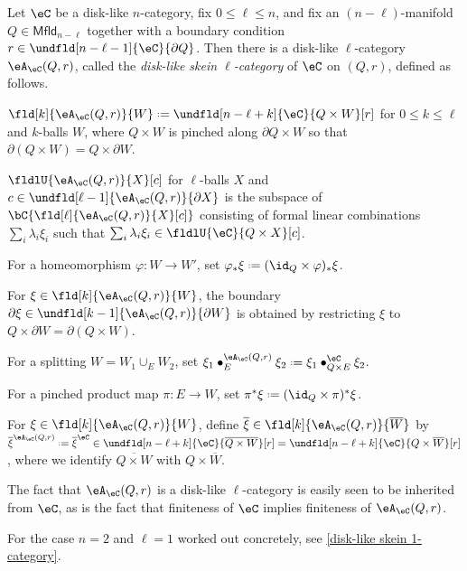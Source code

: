 \documentclass[12pt,reqno]{amsart}
\newcommand{\Mfld}{\mathsf{Mfld}}
\newcommand{\A}{\eA}
\newcommand{\C}{\eC}
\newcommand{\bdy}{\partial}
\newcommand{\blt}{\bullet}
\newcommand{\fcj}[1]{\overline{#1}}
\newcommand{\orev}{\overline}
\newcommand{\defn}[1]{\emph{#1}}
\DeclareRobustCommand{\coloneq}{\mathrel{\vcenter{\baselineskip0.5ex\lineskiplimit0pt\hbox{\scriptsize{\upshape.}}\hbox{\scriptsize{\upshape.}}}}=}
\begin{document}
\begin{definition}[{\cite[Exm. 6.2.4]{MW12}}]
  \label{disk-like skein k-categories}
  Let $\C$ be a disk-like $n$-category, fix $0\leq\ell\leq n$, and fix an $(n-\ell)$-manifold $Q\in\Mfld_{n-\ell}$ together with a boundary condition $r\in\undfld[n-\ell-1]{\C}{\partial Q}$.
  Then there is a disk-like $\ell$-category $\A_\C(Q,r)$, called the \defn{disk-like skein $\ell$-category} of $\C$ on $(Q,r)$, defined as follows.
  \begin{lst}
    \item[\ref{DCk}] $\fld[k]{\A_\C(Q,r)}{W}\coloneq \undfld[n-\ell+k]{\C}{Q\times W}[r]$ for $0\leq k\leq \ell$ and $k$-balls $W$, where $Q\times W$ is pinched along $\partial Q\times W$ so that $\partial(Q\times W)=Q\times\partial W$.
    \item[\ref{DCU}] $\fldlU{\A_\C(Q,r)}{X}[c]$ for $\ell$-balls $X$ and $c\in\undfld[\ell-1]{\A_\C(Q,r)}{\bdy X}$ is the subspace of $\bC\{\fld[\ell]{\A_\C(Q,r)}{X}[ c]\}$ consisting of formal linear combinations $\sum_i\lambda_i\xi_i$ such that $\sum_i\lambda_i\xi_i\in\fldlU{\C}{Q\times X}[c]$.
    \item[\ref{Dvarphi}] For a homeomorphism $\varphi \colon W \to W'$, set $\varphi_*\xi \coloneq (\id_Q \times \varphi)_*\xi$.
    \item[\ref{Dbdk}] For $\xi\in\fld[k]{\A_\C(Q,r)}{W}$, the boundary $\partial\xi\in\undfld[k-1]{\A_\C(Q,r)}{\partial W}$ is obtained by restricting $\xi$ to $Q\times\partial W=\partial(Q\times W)$.
    \item[\ref{DGk}] For a splitting $W = W_1 \cup_E W_2$, set $\xi_1 \blt_E^{\A_\C(Q,r)} \xi_2 \coloneq \xi_1 \blt_{Q \times E}^\C \xi_2$.
    \item[\ref{Dpik}] For a pinched product map $\pi \colon E \to W$, set $\pi^*\xi \coloneq (\id_Q \times \pi)^*\xi$.
    \item[\ref{Drefl}] For $\xi\in\fld[k]{\A_\C(Q,r)}{W}$, define $\fcj\xi \in \fld[k]{\A_\C(Q,r)}{\orev{W}}$ by $\fcj{\xi}^{\A_\C(Q,r)} \coloneq \fcj{\xi}^{\C} \in \undfld[n-\ell+k]{\C}{\orev{Q \times W}}[r] = \undfld[n-\ell+k]{\C}{Q \times \orev{W}}[r]$, where we identify $\orev{Q\times W}$ with $Q\times\orev{W}$.
  \end{lst}
The fact that $\A_\C(Q,r)$ is a disk-like $\ell$-category is easily seen to be inherited from $\C$, as is the fact that finiteness of $\C$ implies finiteness of $\A_\C(Q,r)$.
\end{definition}

For the case $n=2$ and $\ell=1$ worked out concretely, see \cref{disk-like skein 1-category}.
\end{document}

